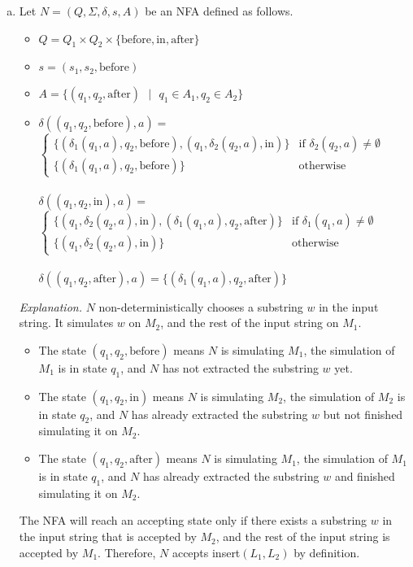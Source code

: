 \documentclass[11pt]{article}
\begin{document}
\begin{solution}
\begin{enumerate}[(a)]
\item
Let $N=(Q,\Sigma,\delta,s,A)$ be an NFA defined as follows.
\begin{itemize}
\item $Q=Q_1\times Q_2 \times \{ \text{before}, \text{in}, \text{after} \}$
\item $s=(s_1, s_2, \text{before})$
\item $A=\{ (q_1, q_2, \text{after}) \text{ } |\text{ } q_1\in A_1, q_2\in A_2 \}$
\item
$\delta((q_1, q_2, \text{before}), a)=$
\begin{math}
  \left\{
    \begin{array}{ll}
		\{ (\delta_1(q_1, a), q_2, \text{before}), (q_1, \delta_2(q_2, a), \text{in}) \} &\text{if } \delta_2(q_2,a) \neq \emptyset\\
		\{ (\delta_1(q_1, a), q_2, \text{before}) \} &\text{otherwise}
    \end{array}
  \right.
\end{math}\\\\
$\delta((q_1, q_2, \text{in}), a)=$
\begin{math}
  \left\{
    \begin{array}{ll}
		\{ (q_1, \delta_2(q_2, a), \text{in}), (\delta_1(q_1, a), q_2, \text{after}) \} &\text{if } \delta_1(q_1,a) \neq \emptyset\\
		\{ (q_1, \delta_2(q_2, a), \text{in}) \} &\text{otherwise}
    \end{array}
  \right.
\end{math}\\\\
$\delta((q_1, q_2, \text{after}), a)=\{ (\delta_1(q_1, a), q_2, \text{after}) \}$
\end{itemize}
\emph{Explanation. }$N$ non-deterministically chooses a substring $w$ in the input string. It simulates $w$ on $M_2$, and the rest of the input string on $M_1$.
\begin{itemize}
\item The state $(q_1, q_2, \text{before})$ means $N$ is simulating $M_1$, the simulation of $M_1$ is in state $q_1$, and $N$ has not extracted the substring $w$ yet.
\item The state $(q_1, q_2, \text{in})$ means $N$ is simulating $M_2$, the simulation of $M_2$ is in state $q_2$, and $N$ has already extracted the substring $w$ but not finished simulating it on $M_2$.
\item The state $(q_1, q_2, \text{after})$ means $N$ is simulating $M_1$, the simulation of $M_1$ is in state $q_1$, and $N$ has already extracted the substring $w$ and finished simulating it on $M_2$.
\end{itemize}
The NFA will reach an accepting state only if there exists a substring $w$ in the input string that is accepted by $M_2$, and the rest of the input string is accepted by $M_1$. Therefore, $N$ accepts insert$(L_1, L_2)$ by definition.


\end{enumerate}
\end{solution}
\end{document}
